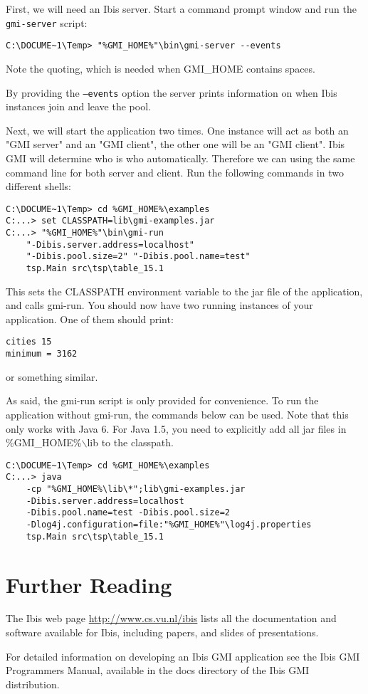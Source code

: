 \documentclass[a4paper,10pt]{article}
\begin{document}
First, we will need an Ibis server. Start a command prompt window and
run the \texttt{gmi-server} script:
\noindent
{\small
\begin{verbatim}
C:\DOCUME~1\Temp> "%GMI_HOME%"\bin\gmi-server --events
\end{verbatim}
}
\noindent

Note the quoting, which is needed when GMI\_HOME contains spaces.

By providing the \texttt{--events} option the server
prints information on when Ibis instances join and leave the pool.

Next, we will start the application two times. One instance will act as both an
"GMI server" and an "GMI client", the other one will be an "GMI client".
Ibis GMI will determine who is who automatically. Therefore we can using the
same command line for both server and client.
Run the following commands in two different shells:

\noindent
{\small
\begin{verbatim}
C:\DOCUME~1\Temp> cd %GMI_HOME%\examples
C:...> set CLASSPATH=lib\gmi-examples.jar
C:...> "%GMI_HOME%"\bin\gmi-run
    "-Dibis.server.address=localhost"
    "-Dibis.pool.size=2" "-Dibis.pool.name=test"
    tsp.Main src\tsp\table_15.1
\end{verbatim}
}
\noindent

This sets the CLASSPATH environment variable to the jar file of the
application, and calls gmi-run. You should now have two running
instances of your application. One of them should print:

\noindent
{\small
\begin{verbatim}
cities 15
minimum = 3162
\end{verbatim}
}
\noindent

or something similar.

As said, the gmi-run script is only provided for convenience. To run
the application without gmi-run, the commands below can be used.
Note that this only works with Java 6. For Java 1.5, you need to
explicitly add all jar files in \%GMI\_HOME\%$\backslash$lib to the classpath.

\noindent
{\small
\begin{verbatim}
C:\DOCUME~1\Temp> cd %GMI_HOME%\examples
C:...> java
    -cp "%GMI_HOME%\lib\*";lib\gmi-examples.jar
    -Dibis.server.address=localhost
    -Dibis.pool.name=test -Dibis.pool.size=2
    -Dlog4j.configuration=file:"%GMI_HOME%"\log4j.properties
    tsp.Main src\tsp\table_15.1
\end{verbatim}
}
\noindent

\section{Further Reading}

The Ibis web page \url{http://www.cs.vu.nl/ibis} lists all
the documentation and software available for Ibis, including papers, and
slides of presentations.

For detailed information on developing an Ibis GMI application see the
Ibis GMI Programmers Manual, available in the docs directory of the Ibis GMI
distribution.
\end{document}
